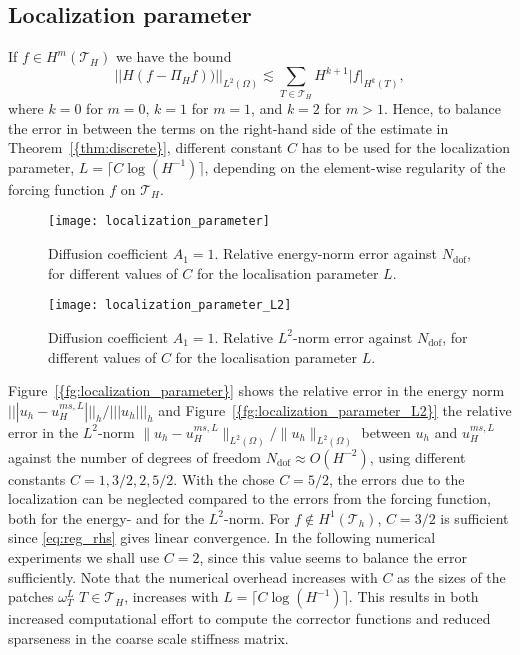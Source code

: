 \documentclass[10pt]{article}
\numberwithin{equation}{section}
\theoremstyle{plain}
\theoremstyle{definition}
\theoremstyle{remark}
\begin{document}
\subsection{Localization parameter}
If $f \in H^{m}({\mathcal{T}}_H)$ we have the bound
\begin{equation}\label{eq:reg_rhs}
  ||H(f-{\Pi_H} f))||_{L^2(\Omega)} \lesssim \sum_{T\in{\mathcal{T}}_H} H^{k+1}|f|_{H^k(T)},
\end{equation}
where $k=0$ for $m=0$, $k=1$ for $m=1$, and $k=2$ for $m>1$. Hence, to balance the error in between the terms on the right-hand side of the estimate in {Theorem~\ref{{thm:discrete}}}, different constant $C$ has to be used for the localization parameter, $L=\lceil C\log(H^{-1})\rceil$, depending on the element-wise regularity of the forcing function $f$ on ${\mathcal{T}}_H$. 
\begin{figure}[th!]
  \centering
  \texttt{[image: localization\_parameter]}
  \caption{Diffusion coefficient $A_1 = 1$. Relative energy-norm error against $N_{\text{dof}}$, for different values of $C$ for the localisation parameter $L$.}
\label{fg:localization_parameter}
\end{figure}
\begin{figure}[th!]
  \centering
  \texttt{[image: localization\_parameter\_L2]}
  \caption{Diffusion coefficient $A_1 = 1$. Relative $L^2$-norm error against $N_{\text{dof}}$, for different values of $C$ for the localisation parameter $L$.}
\label{fg:localization_parameter_L2}
\end{figure}
{Figure~\ref{{fg:localization_parameter}}} shows the relative error in the energy norm ${||| {u_h-u_{H}^{ms,L}} |||_h}/{||| {u_h} |||_h}$ and {Figure~\ref{{fg:localization_parameter_L2}}} the relative error in the $L^2$-norm $\|u_h - u_{H}^{ms,L}\|_{L^2(\Omega)}/\|u_h\|_{L^2(\Omega)}$ between $u_h$ and $u_H^{ms,L}$ against the number of degrees of freedom $N_{\text{dof}}\approx O(H^{-2})$, using different constants $C=1,3/2,2,5/2$. With the chose $C=5/2$, the errors due to the localization can be neglected compared to the errors from the forcing function, both for the energy- and for the $L^2$-norm. For $f\not\in H^1({\mathcal{T}}_h)$, $C=3/2$ is sufficient since \eqref{eq:reg_rhs} gives linear convergence. In the following numerical experiments we shall use $C=2$, since this value seems to balance the error sufficiently. Note that the numerical overhead increases with $C$ as the sizes of the patches $\omega^L_T$ $T\in{\mathcal{T}}_H$, increases with $L=\lceil C\log(H^{-1})\rceil$. This results in both increased computational effort to compute the corrector functions and reduced sparseness in the coarse scale stiffness matrix.
\end{document}

